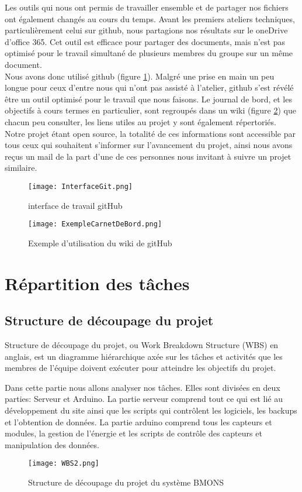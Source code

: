 Les outils qui nous ont permis de travailler ensemble et de partager nos fichiers ont également changés au cours du temps. 
Avant les premiers ateliers techniques, particulièrement celui sur github, nous partagions nos résultats sur le oneDrive d'office 365. Cet outil est efficace pour partager des documents, mais n'est pas optimisé pour le travail simultané de plusieurs membres du groupe sur un même document. \\
Nous avons donc utilisé github (figure \ref{fig:InterfaceGit}). Malgré une prise en main un peu longue pour ceux d'entre nous qui n'ont pas assisté à l'atelier, github s'est révélé être un outil optimisé pour le travail que nous faisons. Le journal de bord, et les objectifs à cours termes en particulier, sont regroupés dans un wiki (figure \ref{fig:ExempleWiki}) que chacun peu consulter, les liens utiles au projet y sont également répertoriés. Notre projet étant open source, la totalité de ces informations sont accessible par tous ceux qui souhaitent s'informer sur l'avancement du projet, ainsi nous avons reçus un mail de la part d'une de ces personnes nous invitant à suivre un projet similaire.

\begin{figure}[h!]
\centering\texttt{[image: InterfaceGit.png]}
\caption{\label{fig:InterfaceGit} interface de travail gitHub}
\end{figure}

\begin{figure}[h!]
\centering\texttt{[image: ExempleCarnetDeBord.png]}
\caption{\label{fig:ExempleWiki} Exemple d'utilisation du wiki de gitHub}
\end{figure}

\chapter{Répartition des tâches}

\section{Structure de découpage du projet}
\vspace{1.0cm}
Structure de découpage du projet, ou Work Breakdown Structure (WBS) en anglais, est un diagramme hiérarchique axée sur les tâches et activités que les membres de l'équipe doivent exécuter pour atteindre les objectifs du projet.

Dans cette partie nous allons analyser nos tâches. Elles sont divisées en deux parties: Serveur et Arduino. La partie serveur comprend tout ce qui est lié au développement du site ainsi que les scripts qui contrôlent les logiciels, les backups et l'obtention de données. La partie arduino comprend tous les capteurs et modules, la gestion de l'énergie et les scripts de contrôle des capteurs et manipulation des données.  
\begin{figure}[h!]
\centering\texttt{[image: WBS2.png]}
\caption{\label{fig:SDP} Structure de découpage du projet du système BMONS}
\end{figure}

